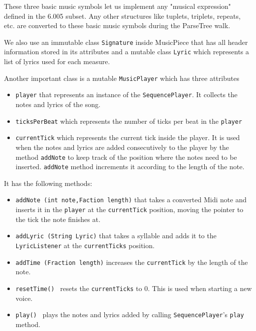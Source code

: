 \documentclass[12pt]{book}
\begin{document}
These three basic music symbols let us implement any "musical expression" defined in the 6.005 subset. Any other structures like tuplets, triplets, repeats, etc. are converted to these basic music symbols during the ParseTree walk.  

We also use an immutable class {\tt Signature} inside MusicPiece that has all header information stored in its attributes and a mutable class {\tt Lyric} which represents a list of lyrics used for each measure.


\noindent\makebox[\linewidth]{\rule{\textwidth}{0.4pt}}

\medskip
Another important class is a mutable {\tt MusicPlayer} which has three attributes 
\begin{itemize} 
\item { \tt player} that represents an instance of the {\tt SequencePlayer}. It collects the notes and lyrics of the song.
\item { \tt ticksPerBeat} which represents the number of ticks per beat in the {\tt player}
\item { \tt currentTick} which represents the current tick inside the player. It is used when the notes and lyrics are added consecutively to the player by the method {\tt addNote} to keep track of the position  where the notes need to be inserted. {\tt addNote} method increments it according to the length of the note.
\end{itemize}
It has the following methods:
\begin{itemize} 
\item { \tt addNote (int note,Faction length)} that takes a converted Midi note and inserts it in the {\tt player} at the {\tt currentTick} position, moving the pointer to the tick the note finishes at.
\item { \tt addLyric (String Lyric)} that takes a syllable and adds it to the {\tt LyricListener} at the {\tt currentTicks} position.
\item { \tt addTime (Fraction length)} increases the {\tt currentTick} by the length of the note.
\item { \tt resetTime() } resets the {\tt currentTicks} to 0. This is used when starting a new voice.
\item { \tt play() } plays the notes and lyrics added by calling {\tt SequencePlayer}'s {\tt play} method. 
\end{itemize}

\bigskip

\end{document}
